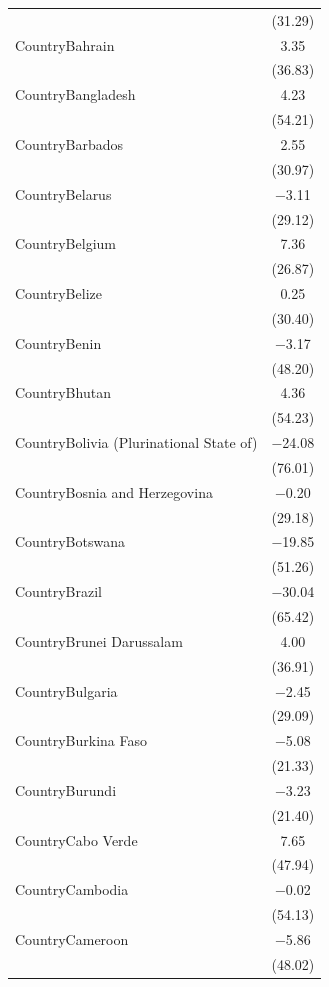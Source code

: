 \documentclass[
  letterpaper,
  DIV=11,
  numbers=noendperiod]{scrartcl}
\begin{document}
\begin{table}
{\begin{tabular}[t]{lc}
 & (\num{31.29})\\
CountryBahrain & \num{3.35}\\
 & (\num{36.83})\\
CountryBangladesh & \num{4.23}\\
 & (\num{54.21})\\
CountryBarbados & \num{2.55}\\
 & (\num{30.97})\\
CountryBelarus & \num{-3.11}\\
 & (\num{29.12})\\
CountryBelgium & \num{7.36}\\
 & (\num{26.87})\\
CountryBelize & \num{0.25}\\
 & (\num{30.40})\\
CountryBenin & \num{-3.17}\\
 & \vphantom{1} (\num{48.20})\\
CountryBhutan & \num{4.36}\\
 & (\num{54.23})\\
CountryBolivia (Plurinational State of) & \num{-24.08}\\
 & (\num{76.01})\\
CountryBosnia and Herzegovina & \num{-0.20}\\
 & (\num{29.18})\\
CountryBotswana & \num{-19.85}\\
 & (\num{51.26})\\
CountryBrazil & \num{-30.04}\\
 & (\num{65.42})\\
CountryBrunei Darussalam & \num{4.00}\\
 & (\num{36.91})\\
CountryBulgaria & \num{-2.45}\\
 & (\num{29.09})\\
CountryBurkina Faso & \num{-5.08}\\
 & (\num{21.33})\\
CountryBurundi & \num{-3.23}\\
 & (\num{21.40})\\
CountryCabo Verde & \num{7.65}\\
 & (\num{47.94})\\
CountryCambodia & \num{-0.02}\\
 & \vphantom{1} (\num{54.13})\\
CountryCameroon & \num{-5.86}\\
 & (\num{48.02})\\

\end{tabular}}
\end{table}
\end{document}
